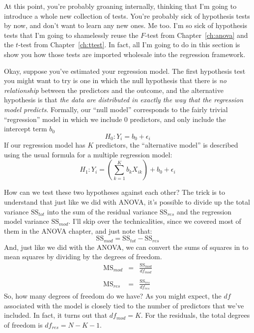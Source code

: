 At this point, you're probably groaning internally, thinking that I'm going to introduce a whole new collection of tests. You're probably sick of hypothesis tests by now, and don't want to learn any new ones. Me too. I'm so sick of hypothesis tests that I'm going to shamelessly reuse the $F$-test from Chapter~\ref{ch:anova} and the $t$-test from Chapter~\ref{ch:ttest}. In fact, all I'm going to do in this section is show you how those tests are imported wholesale into the regression framework.  


Okay, suppose you've estimated your regression model. The first hypothesis test you might want to try is one in which the null hypothesis that there is {\it no relationship} between the predictors and the outcome, and the alternative hypothesis is that {\it the data are distributed in exactly the way that the regression model predicts}. Formally, our ``null model'' corresponds to the fairly trivial ``regression'' model in which we include 0 predictors, and only include the intercept term $b_0$
$$
H_0: Y_i = b_0 + \epsilon_i
$$
If our regression model has $K$ predictors, the ``alternative model'' is described using the usual formula for a multiple regression model:
$$
H_1: Y_i = \left( \sum_{k=1}^K b_{k} X_{ik} \right) + b_0 + \epsilon_i
$$

How can we test these two hypotheses against each other? The trick is to understand that just like we did with ANOVA, it's possible to divide up the total variance $\mbox{SS}_{tot}$ into the sum of the residual variance $\mbox{SS}_{res}$ and the regression model variance $\mbox{SS}_{mod}$. I'll skip over the technicalities, since we covered most of them in the ANOVA chapter, and just note that:
$$
\mbox{SS}_{mod} = \mbox{SS}_{tot} - \mbox{SS}_{res}
$$
And, just like we did with the ANOVA, we can convert the sums of squares in to mean squares by dividing by the degrees of freedom. 
$$\begin{array}{rcl}
\mbox{MS}_{mod} &=& \displaystyle\frac{\mbox{SS}_{mod} }{df_{mod}} \\ \\
\mbox{MS}_{res} &=& \displaystyle\frac{\mbox{SS}_{res} }{df_{res}} 
\end{array}
$$ 
So, how many degrees of freedom do we have? As you might expect, the $df$ associated with the model is closely tied to the number of predictors that we've included. In fact, it turns out that $df_{mod} = K$. For the residuals, the total degrees of freedom is $df_{res} = N -K - 1$. 

